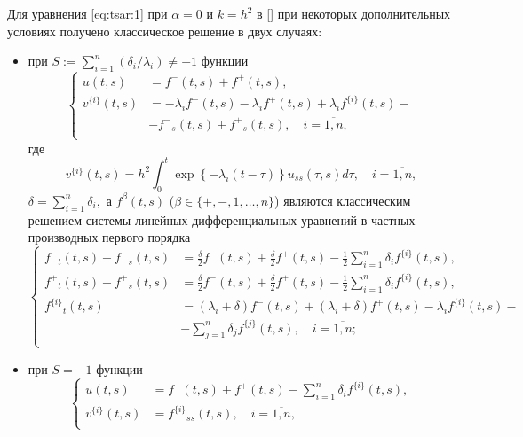 Для уравнения \eqref{eq:tsar:1} при $\alpha=0$ и $k=h^2$ в []
при некоторых дополнительных условиях получено классическое решение в двух случаях: 
\begin{itemize}
 \item[--]
при $S:=\sum_{i=1}^{n} \left( \delta_i / \lambda_i \right) \ne -1$ функции 
\begin{equation}
\left\{
\begin{aligned}
u(t,s) &= {f^-}(t,s) + {f^+}(t,s), \\
v^{\{i\}}(t,s) &= - \lambda_i {f^-}(t,s)
				  - \lambda_i {f^+}(t,s)
				  + \lambda_i {f^{\{i\}}}(t,s) -
\\&
				  - {f^-}_s(t,s)+{f^+}_s(t,s), \quad i = \overline{ 1, n },\\
\end{aligned}
\right.
\label{eq:tsar:1_3}
\end{equation}
где $$v^{\{i\}}(t,s) = h^2 \int^t_0\exp \left\{ -\lambda_i (t-\tau) \right\} u_{ss}(\tau,s)d\tau,\quad i = \overline{ 1,n },$$
$\delta = \sum_{i=1}^{n} \delta_i,$
а $f^\beta(t,s)$ ($ \beta \in \{+, -,1, \dots, n \} $) являются классическим решением системы линейных дифференциальных
уравнений в частных производных первого порядка
$$
\left\{
\begin{aligned}
{f^-}_t(t,s) + {f^-}_s(t,s) &=  \frac{\delta}{2} {f^-}(t,s) 
							   +\frac{\delta}{2} {f^+}(t,s) 
							   - \frac{1}{2} \sum_{i=1}^{n} \delta_i {f^{\{i\}}}(t,s), \\
{f^+}_t(t,s) - {f^+}_s(t,s) &=  \frac{\delta}{2} {f^-}(t,s) 
							   +\frac{\delta}{2} {f^+}(t,s) 
							   - \frac{1}{2} \sum_{i=1}^{n} \delta_i {f^{\{i\}}}(t,s), \\
{f^{\{i\}}}_t(t,s) &=   \left( \lambda_i + \delta \right) {f^-}(t,s) 
					  + \left( \lambda_i + \delta \right) {f^+}(t,s) 
					  - \lambda_i {f^{\{i\}}}(t,s) -
\\&
					  - \sum_{j =1}^n \delta_j {f^{\{j\}}}(t,s) 
					  , \quad i = \overline{ 1,n };\\
\end{aligned}
\right.
$$
\item[--]
при $S= -1$ функции 
\begin{equation}
\left\{
\begin{aligned}
u(t,s) &= {f^-}(t,s) 
		  + {f^+}(t,s) 
		  - \sum_{i=1}^n \delta_i {f^{\{i\}}}(t,s), \\
v^{\{i\}}(t,s) &= {f^{\{i\}}}_{ss}(t,s), \quad i = \overline{ 1,n },\\

\end{aligned}
\end{equation}
\end{itemize}
